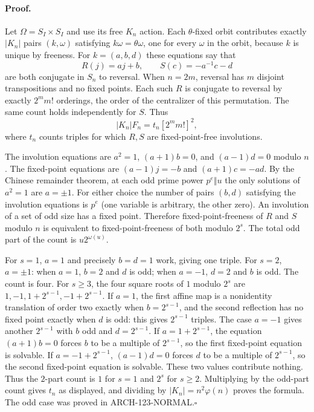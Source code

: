 \paragraph{Proof.}
Let $\Omega=S_I\times S_I$ and use its free $K_n$ action.  Each
$\theta$-fixed orbit contributes exactly $|K_n|$ pairs
$(k,\omega)$ satisfying $k\omega=\theta\omega$, one for every
$\omega$ in the orbit, because $k$ is unique by freeness.
For $k=(a,b,d)$ these equations say that
\[
 R(j)=aj+b,\qquad S(c)=-a^{-1}c-d
\]
are both conjugate in $S_n$ to reversal.  When $n=2m$, reversal has
$m$ disjoint transpositions and no fixed points.  Each such $R$
is conjugate to reversal by exactly $2^m m!$ orderings, the order
of the centralizer of this permutation.  The same count holds
independently for $S$.  Thus
\[
 |K_n|F_n=t_n[2^m m!]^2,
\]
where $t_n$ counts triples for which $R,S$ are fixed-point-free
involutions.

The involution equations are
$a^2=1$, $(a+1)b=0$, and $(a-1)d=0$ modulo $n$.
The fixed-point equations are $(a-1)j=-b$ and
$(a+1)c=-ad$.  By the Chinese remainder theorem, at each odd
prime power $p^e\Vert u$ the only solutions of $a^2=1$ are
$a=\pm1$.  For either choice the number of pairs $(b,d)$
satisfying the involution equations is $p^e$ (one variable is
arbitrary, the other zero).  An involution of a set of odd size
has a fixed point.  Therefore fixed-point-freeness of $R$ and $S$
modulo $n$ is equivalent to fixed-point-freeness of both modulo
$2^s$.  The total odd part of the count is $u2^{\omega(u)}$.

For $s=1$, $a=1$ and precisely $b=d=1$ work, giving one
triple.  For $s=2$, $a=\pm1$: when $a=1$, $b=2$ and $d$
is odd; when $a=-1$, $d=2$ and $b$ is odd.  The count is four.
For $s\geq3$, the four square roots of $1$ modulo $2^s$ are
$1,-1,1+2^{s-1},-1+2^{s-1}$.  If $a=1$, the first affine
map is a nonidentity translation of order two exactly when
$b=2^{s-1}$, and the second reflection has no fixed point
exactly when $d$ is odd: this gives $2^{s-1}$ triples.  The
case $a=-1$ gives another $2^{s-1}$ with $b$ odd and
$d=2^{s-1}$.  If $a=1+2^{s-1}$, the equation $(a+1)b=0$
forces $b$ to be a multiple of $2^{s-1}$, so the first
fixed-point equation is solvable.  If $a=-1+2^{s-1}$,
$(a-1)d=0$ forces $d$ to be a multiple of $2^{s-1}$,
so the second fixed-point equation is solvable.  These two
values contribute nothing.  Thus the $2$-part count is
$1$ for $s=1$ and $2^s$ for $s\geq2$.  Multiplying by
the odd-part count gives $t_n$ as displayed, and dividing by
$|K_n|=n^2\varphi(n)$ proves the formula.  The odd case was
proved in ARCH-123-NORMAL.\hfill$\square$

